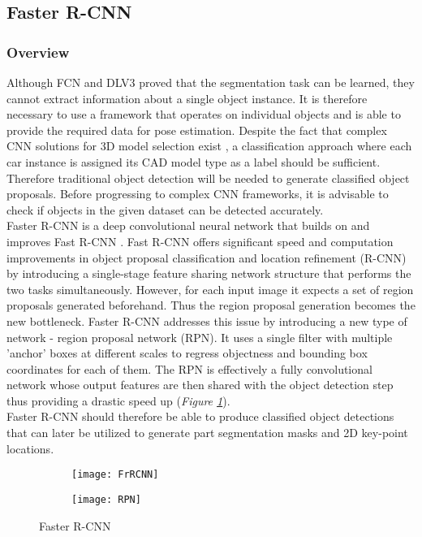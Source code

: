 \documentclass[main.tex]{subfiles}
\begin{document}
\subsection{Faster R-CNN}
\subsubsection{Overview}
\indent Although FCN and DLV3 proved that the segmentation task can be learned, they cannot extract information about a single object instance. It is therefore necessary to use a framework that operates on individual objects and is able to provide the required data for pose estimation. Despite the fact that complex CNN solutions for 3D model selection exist \cite{Grabner2018}, a classification approach where each car instance is assigned its CAD model type as a label should be sufficient. Therefore traditional object detection will be needed to generate classified object proposals. Before progressing to complex CNN frameworks, it is advisable to check if objects in the given dataset can be detected accurately.\\ 
\indent Faster R-CNN \cite{Ren2017} is a deep convolutional neural network that builds on and improves Fast R-CNN \cite{Girshick2015}. Fast R-CNN offers significant speed and computation improvements in object proposal classification and location refinement (R-CNN) by introducing a single-stage feature sharing network structure that performs the two tasks simultaneously. However, for each input image it expects a set of region proposals generated beforehand. Thus the region proposal generation becomes the new bottleneck. Faster R-CNN addresses this issue by introducing a new type of network - region proposal network (RPN). It uses a single filter with multiple 'anchor' boxes at different scales to regress objectness and bounding box coordinates for each of them. The RPN is effectively a fully convolutional network whose output features are then shared with the object detection step thus providing a drastic speed up (\emph{Figure \ref{fig:frcnn}}).\\
\indent Faster R-CNN should therefore be able to produce classified object detections that can later be utilized to generate part segmentation masks and 2D key-point locations.
\indent 
\begin{figure}[h]
\centering
\begin{subfigure}[c]{0.5\textwidth}
\centering
\texttt{[image: FrRCNN]}
\end{subfigure}%
\begin{subfigure}[c]{0.5\textwidth}
\centering
\texttt{[image: RPN]}
\end{subfigure}%
\caption{Faster R-CNN \cite{Ren2017}}
\label{fig:frcnn}
\end{figure}
\end{document}
